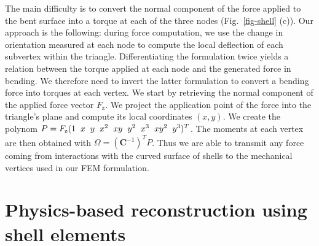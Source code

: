 \documentclass{llncs}
\begin{document}
The main difficulty is to convert the normal component of the force applied to the bent surface into a torque at each of the three nodes (Fig.~\ref{fig-shell} (c)). Our approach is the following: during force computation, we use the change in orientation measured at each node to compute the local deflection of each subvertex within the triangle. Differentiating the formulation twice yields a relation between the torque applied at each node and the generated force in bending. We therefore need to invert the latter formulation to convert a bending force into torques at each vertex. We start by retrieving the normal component of the applied force vector $F_{\mathrm{z}}$. We project the application point of the force into the triangle's plane and compute its local coordinates $(x,y)$. We create the polynom $P = F_{\mathrm{z}}(1 \hspace{0.2cm} x \hspace{0.2cm} y \hspace{0.2cm} x^2 \hspace{0.2cm} xy \hspace{0.2cm} y^2 \hspace{0.2cm} x^3 \hspace{0.2cm} xy^2 \hspace{0.2cm} y^3)^T$. The moments at each vertex are then obtained with $\Omega = (\textbf{C}^{-1})^T P$.  Thus we are able to transmit any force coming from interactions with the curved surface of shells to the mechanical vertices used in our FEM formulation. 

\section{Physics-based reconstruction using shell elements}
\label{sec:mesh}
\end{document}
